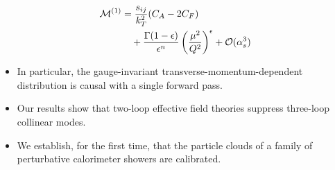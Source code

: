 \begin{align}
  \mathcal{M}^{(1)} &= \frac{s_{ij}}{k_T^2} (C_A - 2C_F) \nonumber \\
  &\quad + \frac{\Gamma(1-\epsilon)}{\epsilon^{n}} \left(\frac{\mu^2}{Q^2}\right)^{\epsilon} + \mathcal{O}(\alpha_s^3) \label{eq:2}
\end{align}

\begin{itemize}
  \item In particular, the gauge-invariant transverse-momentum-dependent distribution is causal with a single forward pass.
  \item Our results show that two-loop effective field theories suppress three-loop collinear modes.
  \item We establish, for the first time, that the particle clouds of a family of perturbative calorimeter showers are calibrated.
\end{itemize}

